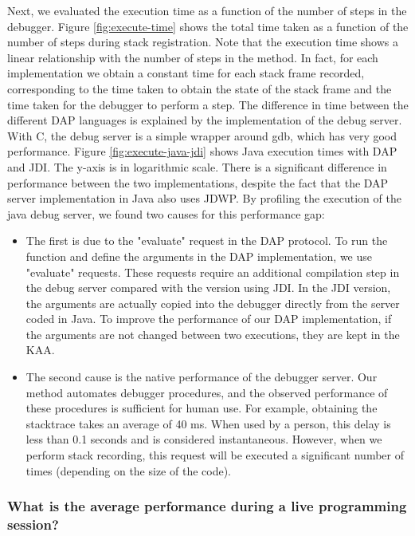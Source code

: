 \documentclass[english,submission]{programming}
\begin{document}
Next, we evaluated the execution time as a function of the number of steps in the debugger. 
Figure \ref{fig:execute-time} shows the total time taken as a function of the number of steps during stack registration.
Note that the execution time shows a linear relationship with the number of steps in the method.
In fact, for each implementation we obtain a constant time for each stack frame recorded, corresponding to the time taken to obtain the state of the stack frame and the time taken for the debugger to perform a step. 
The difference in time between the different DAP languages is explained by the implementation of the debug server. 
With C, the debug server is a simple wrapper around gdb, which has very good performance.
Figure \ref{fig:execute-java-jdi} shows Java execution times with DAP and JDI. 
The y-axis is in logarithmic scale. 
There is a significant difference in performance between the two implementations, despite the fact that the DAP server implementation in Java also uses JDWP.
By profiling the execution of the java debug server, we found two causes for this performance gap:
\begin{itemize}
  \item The first is due to the "evaluate" request in the DAP protocol. To run the function and define the arguments in the DAP implementation, we use "evaluate" requests. These requests require an additional compilation step in the debug server compared with the version using JDI. In the JDI version, the arguments are actually copied into the debugger directly from the server coded in Java. To improve the performance of our DAP implementation, if the arguments are not changed between two executions, they are kept in the KAA.
  \item The second cause is the native performance of the debugger server. Our method automates debugger procedures, and the observed performance of these procedures is sufficient for human use. For example, obtaining the stacktrace takes an average of 40 ms. When used by a person, this delay is less than 0.1 seconds and is considered instantaneous. However, when we perform stack recording, this request will be executed a significant number of times (depending on the size of the code).
\end{itemize}

\subsubsection{What is the average performance during a live programming session?}
\end{document}

